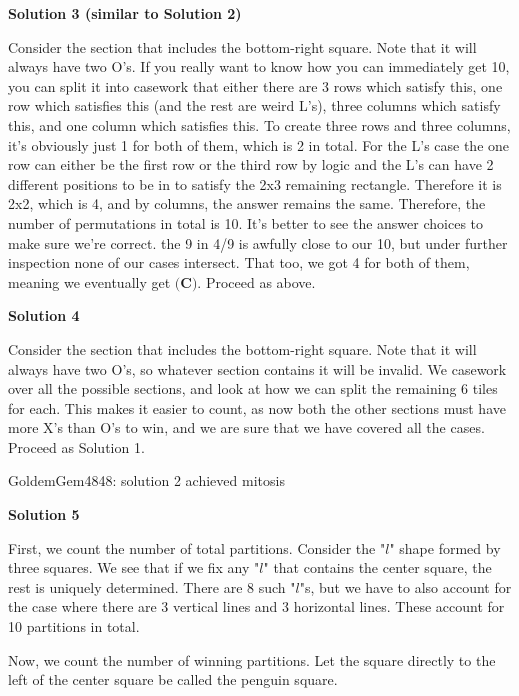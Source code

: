 \begin{enumerate}
 



\textbf{Solution 3 (similar to Solution 2)}

Consider the section that includes the bottom-right square. Note that it will always have two O's.  If you really want to know how you can immediately get 10, you can split it into casework that either there are 3 rows which satisfy this, one row which satisfies this (and the rest are weird L's), three columns which satisfy this, and one column which satisfies this. To create three rows and three columns, it's obviously just 1 for both of them, which is 2 in total. For the L's case the one row can either be the first row or the third row by logic and the L's can have 2 different positions to be in to satisfy the 2x3 remaining rectangle. Therefore it is 2x2, which is 4, and by columns, the answer remains the same. Therefore, the number of permutations in total is 10. It's better to see the answer choices to make sure we're correct. the 9 in 4/9 is awfully close to our 10, but under further inspection none of our cases intersect. That too, we got 4 for both of them, meaning we eventually get $\boxed{\textbf{(C)}}$. Proceed as above.

 



\textbf{Solution 4}

Consider the section that includes the bottom-right square. Note that it will always have two O's, so whatever section contains it will be invalid. We casework over all the possible sections, and look at how we can split the remaining 6 tiles for each. This makes it easier to count, as now both the other sections must have more X's than O's to win, and we are sure that we have covered all the cases. Proceed as Solution 1.

 GoldemGem4848: solution 2 achieved mitosis

 



\textbf{Solution 5}

First, we count the number of total partitions. Consider the "$l$" shape formed by three squares. We see that if we fix any "$l$" that contains the center square, the rest is uniquely determined. There are 8 such "$l$"s, but we have to also account for the case where there are 3 vertical lines and 3 horizontal lines. These account for 10 partitions in total.

 Now, we count the number of winning partitions. Let the square directly to the left of the center square be called the penguin square.


\end{enumerate}
